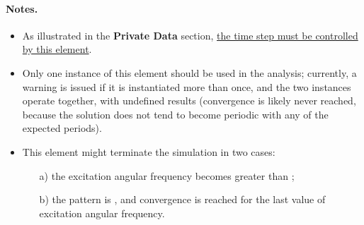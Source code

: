 \paragraph{Notes.}
\begin{itemize}
\item As illustrated in the \textbf{Private Data}  section, \underline{the time step must be controlled by this element}.

\item Only one instance of this element should be used in the analysis; currently, a warning is issued if it is instantiated more than once, and the two instances operate together, with undefined results (convergence is likely never reached, because the solution does not tend to become periodic with any of the expected periods).

\item This element might terminate the simulation in two cases:
\begin{itemize}
\item[a)] the excitation angular frequency becomes greater than ;
\item[b)] the  pattern is , and convergence is reached for the last value of excitation angular frequency.
\end{itemize}
\end{itemize}

